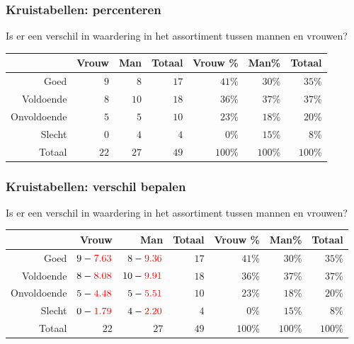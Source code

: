 \documentclass{beamer}
\begin{document}
    \begin{frame}
      \frametitle{Kruistabellen: percenteren}
      Is er een verschil in waardering in het assortiment tussen mannen en vrouwen?
      \begin{adjustwidth}{-1.5em}{-1.5em}
        \begin{table}[h] \centering
          \begin{tabular}{@{}rrrrrrr@{}} \toprule
            & Vrouw & Man & Totaal & Vrouw \% & Man\%   & Totaal  \\ \midrule
            Goed        & $9$     & $8$  & $17$     & $41$\%  & $30$\%  & $35$\% \\
            Voldoende   & $8$     & $10$ & $18$     & $36$\%  & $37$\%  & $37$\% \\
            Onvoldoende & $5$     & $5$  & $10$     & $23$\%  & $18$\%  & $20$\% \\
            Slecht      & $0$     & $4$  & $4$      & $0$\%   & $15$\%  & $8$\%  \\
            Totaal      & $22$    & $27$ & $49$     & $100$\% & $100$\% & $100$\%\\
            \bottomrule
          \end{tabular}
        \end{table}
      \end{adjustwidth}
    \end{frame}


    \begin{frame}
      \frametitle{Kruistabellen: verschil bepalen}
      Is er een verschil in waardering in het assortiment tussen mannen en vrouwen?
      \begin{adjustwidth}{-1.5em}{-1.5em}
        \begin{table}[h] \centering
          \begin{tabular}{@{}rrrrrrr@{}} \toprule
            & Vrouw & Man & Totaal & Vrouw \% & Man\%   & Totaal  \\ \midrule
            Goed        & $9 -\textcolor{red}{7.63}$     & $8 - \textcolor{red}{9.36}$   & $17$     & $41$\%  & $30$\% & $35$\% \\
            Voldoende   & $8 - \textcolor{red}{8.08}$   & $10 - \textcolor{red}{9.91}$  & $18$     & $36$\%  & $37$\%    & $37$\% \\
            Onvoldoende & $5 - \textcolor{red}{4.48}$    & $5 - \textcolor{red}{5.51}$  & $10$     & $23$\%  & $18$\% & $20$\% \\
            Slecht      & $0 - \textcolor{red}{1.79}$    & $4 - \textcolor{red}{2.20}$  & $4$      & $0$\%      & $15$\% & $8$\%  \\
            Totaal      & $22$    & $27$  & $49$     & $100$\%    & $100$\%   & $100$\%   \\
            \bottomrule
          \end{tabular}
        \end{table}
      \end{adjustwidth}
    \end{frame}
\end{document}
